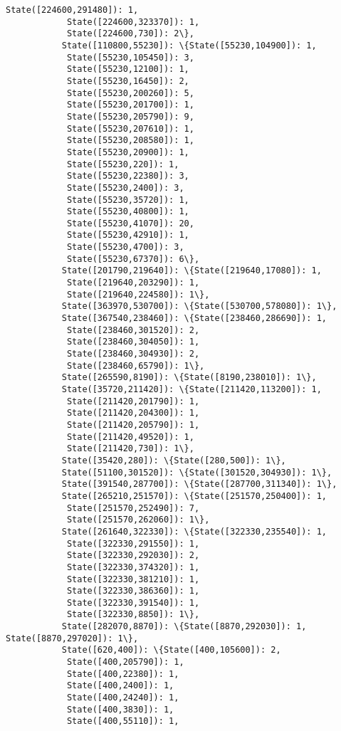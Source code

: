 \documentclass[11pt]{article}
\begin{document}
\begin{Verbatim}[commandchars=\\\{\}]
            State([224600,291480]): 1,
            State([224600,323370]): 1,
            State([224600,730]): 2\},
           State([110800,55230]): \{State([55230,104900]): 1,
            State([55230,105450]): 3,
            State([55230,12100]): 1,
            State([55230,16450]): 2,
            State([55230,200260]): 5,
            State([55230,201700]): 1,
            State([55230,205790]): 9,
            State([55230,207610]): 1,
            State([55230,208580]): 1,
            State([55230,20900]): 1,
            State([55230,220]): 1,
            State([55230,22380]): 3,
            State([55230,2400]): 3,
            State([55230,35720]): 1,
            State([55230,40800]): 1,
            State([55230,41070]): 20,
            State([55230,42910]): 1,
            State([55230,4700]): 3,
            State([55230,67370]): 6\},
           State([201790,219640]): \{State([219640,17080]): 1,
            State([219640,203290]): 1,
            State([219640,224580]): 1\},
           State([363970,530700]): \{State([530700,578080]): 1\},
           State([367540,238460]): \{State([238460,286690]): 1,
            State([238460,301520]): 2,
            State([238460,304050]): 1,
            State([238460,304930]): 2,
            State([238460,65790]): 1\},
           State([265590,8190]): \{State([8190,238010]): 1\},
           State([35720,211420]): \{State([211420,113200]): 1,
            State([211420,201790]): 1,
            State([211420,204300]): 1,
            State([211420,205790]): 1,
            State([211420,49520]): 1,
            State([211420,730]): 1\},
           State([35420,280]): \{State([280,500]): 1\},
           State([51100,301520]): \{State([301520,304930]): 1\},
           State([391540,287700]): \{State([287700,311340]): 1\},
           State([265210,251570]): \{State([251570,250400]): 1,
            State([251570,252490]): 7,
            State([251570,262060]): 1\},
           State([261640,322330]): \{State([322330,235540]): 1,
            State([322330,291550]): 1,
            State([322330,292030]): 2,
            State([322330,374320]): 1,
            State([322330,381210]): 1,
            State([322330,386360]): 1,
            State([322330,391540]): 1,
            State([322330,8850]): 1\},
           State([282070,8870]): \{State([8870,292030]): 1, State([8870,297020]): 1\},
           State([620,400]): \{State([400,105600]): 2,
            State([400,205790]): 1,
            State([400,22380]): 1,
            State([400,2400]): 1,
            State([400,24240]): 1,
            State([400,3830]): 1,
            State([400,55110]): 1,

\end{Verbatim}
\end{document}
